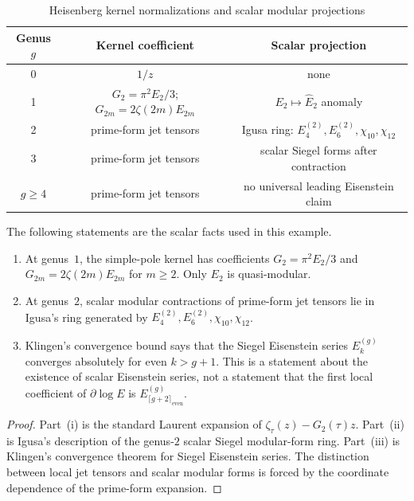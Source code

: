 \begin{table}[ht]
\centering
\caption{Heisenberg kernel normalizations and scalar modular projections}
\label{tab:modular-weights}
\begin{tabular}{|c|c|c|}
\hline
\textbf{Genus $g$} & \textbf{Kernel coefficient} & \textbf{Scalar projection} \\
\hline
0 & $1/z$ & none \\
\hline
1 & $G_2=\pi^2E_2/3$; $G_{2m}=2\zeta(2m)E_{2m}$ & $E_2\mapsto \widehat{E}_2$ anomaly \\
\hline
2 & prime-form jet tensors & Igusa ring: $E_4^{(2)},E_6^{(2)},\chi_{10},\chi_{12}$ \\
\hline
3 & prime-form jet tensors & scalar Siegel forms after contraction \\
\hline
$g\ge4$ & prime-form jet tensors & no universal leading Eisenstein claim \\
\hline
\end{tabular}
\end{table}

\begin{proposition}\label{prop:modular-weight-formula}
The following statements are the scalar facts used in this example.
\begin{enumerate}[label=\textup{(\roman*)}]
\item At genus~$1$, the simple-pole kernel has coefficients
$G_2=\pi^2E_2/3$ and $G_{2m}=2\zeta(2m)E_{2m}$ for $m\ge2$.
Only $E_2$ is quasi-modular.
\item At genus~$2$, scalar modular contractions of prime-form jet
tensors lie in Igusa's ring generated by
$E_4^{(2)},E_6^{(2)},\chi_{10},\chi_{12}$.
\item Klingen's convergence bound says that the Siegel Eisenstein
series $E_k^{(g)}$ converges absolutely for even $k>g+1$. This is a
statement about the existence of scalar Eisenstein series, not a
statement that the first local coefficient of $\partial\log E$ is
$E_{\lceil g+2\rceil_{\mathrm{even}}}^{(g)}$.
\end{enumerate}
\end{proposition}

\begin{proof}
Part~(i) is the standard Laurent expansion of
$\zeta_\tau(z)-G_2(\tau)z$. Part~(ii) is Igusa's description of the
genus-$2$ scalar Siegel modular-form ring. Part~(iii) is Klingen's
convergence theorem for Siegel Eisenstein series. The distinction
between local jet tensors and scalar modular forms is forced by the
coordinate dependence of the prime-form expansion.
\end{proof}

